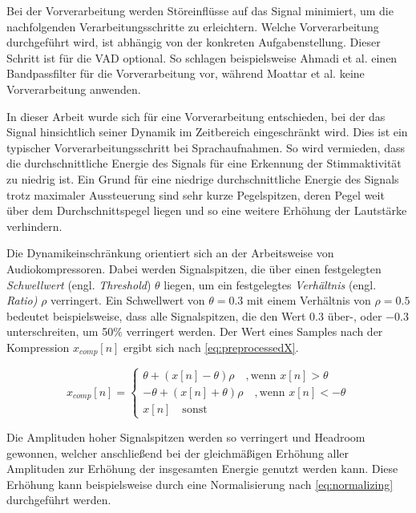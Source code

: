 Bei der Vorverarbeitung werden Störeinflüsse auf das Signal minimiert, um die nachfolgenden Verarbeitungsschritte zu erleichtern. Welche Vorverarbeitung durchgeführt wird, ist abhängig von der konkreten Aufgabenstellung. Dieser Schritt ist für die VAD optional. So schlagen beispielsweise Ahmadi et al. \cite{vad_ceps} einen Bandpassfilter für die Vorverarbeitung vor, während Moattar et al. \cite{vad_Easy} keine Vorverarbeitung anwenden. 

In dieser Arbeit wurde sich für eine Vorverarbeitung entschieden, bei der das Signal hinsichtlich seiner Dynamik im Zeitbereich eingeschränkt wird. Dies ist ein typischer Vorverarbeitungsschritt bei Sprachaufnahmen. So wird vermieden, dass die durchschnittliche Energie des Signals für eine Erkennung der Stimmaktivität zu niedrig ist. Ein Grund für eine niedrige durchschnittliche Energie des Signals trotz maximaler Aussteuerung sind sehr kurze Pegelspitzen, deren Pegel weit über dem Durchschnittspegel liegen und so eine weitere Erhöhung der Lautstärke verhindern.\cite[S. 1 - 2]{schottland_comp}

Die Dynamikeinschränkung orientiert sich an der Arbeitsweise von Audiokompressoren. Dabei werden Signalspitzen, die über einen festgelegten \emph{Schwellwert} (engl. \emph{Threshold}) $\theta$ liegen, um ein festgelegtes \emph{Verhältnis} (engl. \emph{Ratio)} $\rho$ verringert. Ein Schwellwert von $\theta = 0.3$ mit einem Verhältnis von $\rho = 0.5$ bedeutet beispielsweise, dass alle Signalspitzen, die den Wert 0.3 über-, oder $-0.3$ unterschreiten, um 50\% verringert werden. Der Wert eines Samples nach der Kompression $x_{comp}[n]$ ergibt sich nach \autoref{eq:preprocessedX}.\cite[S. 400 - 401]{compressorPaper}

\begin{equation}
x_{comp}[n] =
\begin{cases}
\theta + (x[n] - \theta) \rho \quad , \text{wenn } x[n] > \theta \\
-\theta + (x[n] + \theta) \rho \quad, \text{wenn } x[n] < -\theta \\
x[n] \quad \text{sonst}
\end{cases}
\label{eq:preprocessedX}
\end{equation}

Die Amplituden hoher Signalspitzen werden so verringert und Headroom gewonnen, welcher anschließend bei der gleichmäßigen Erhöhung aller Amplituden zur Erhöhung der insgesamten Energie genutzt werden kann. \cite[S. 400 - 401]{compressorPaper}
    Diese Erhöhung kann beispielsweise durch eine Normalisierung nach \autoref{eq:normalizing} durchgeführt werden.


